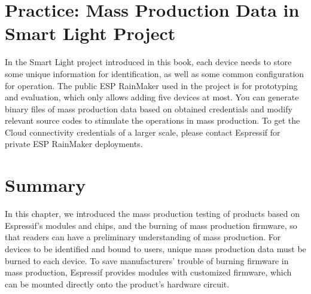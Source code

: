 \documentclass[a4paper,12pt]{book}
\begin{document}
\section{Practice: Mass Production Data in Smart Light Project}

In the Smart Light project introduced in this book, each device needs to store some unique information for identification, as well as some common configuration for operation. The public ESP RainMaker used in the project is for prototyping and evaluation, which only allows adding five devices at most. You can generate binary files of mass production data based on obtained credentials and modify relevant source codes to stimulate the operations in mass production. To get the Cloud connectivity credentials of a larger scale, please contact Espressif for private ESP RainMaker deployments.

\section{Summary}

In this chapter, we introduced the mass production testing of products based on Espressif's modules and chips, and the burning of mass production firmware, so that readers can have a preliminary understanding of mass production. For devices to be identified and bound to users, unique mass production data must be burned to each device. To save manufacturers’ trouble of burning firmware in mass production, Espressif provides modules with customized firmware, which can be mounted directly onto the product’s hardware circuit.
\end{document}
